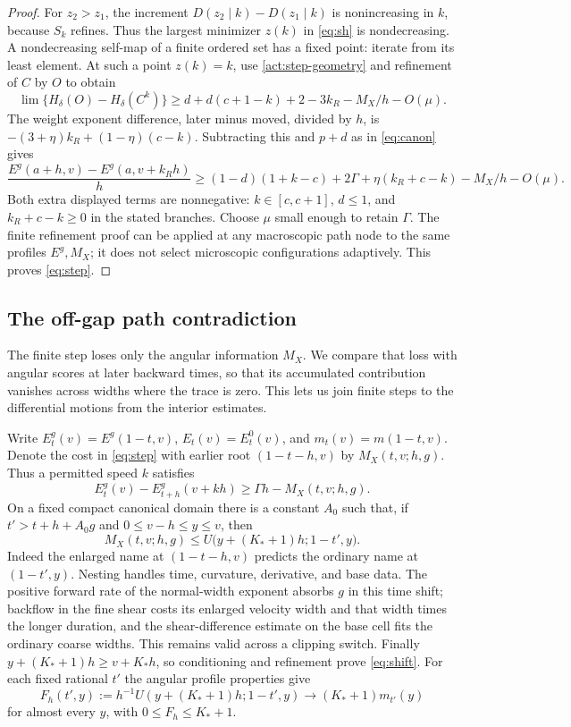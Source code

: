 \begin{proof}
For $z_2>z_1$, the increment
$D(z_2\mid k)-D(z_1\mid k)$ is nonincreasing in $k$, because
$S_k$ refines.  Thus the largest minimizer $z(k)$ in
\eqref{eq:sh} is nondecreasing.  A nondecreasing self-map of a
finite ordered set has a fixed point: iterate from its least
element.  At such a point $z(k)=k$, use
\eqref{act:step-geometry} and refinement of $C$ by $O$ to obtain
\[
 \lim\{H_\delta(O)-H_\delta(C^k)\}
 \ge d+d(c+1-k)+2-3k_R-M_X/h-O(\mu).
\]
The weight exponent difference, later minus moved, divided by $h$,
is $-(3+\eta)k_R+(1-\eta)(c-k)$.  Subtracting this and $p+d$
as in \eqref{eq:canon} gives
\[
 \frac{E^g(a+h,v)-E^g(a,v+k_Rh)}h
 \ge(1-d)(1+k-c)+2\Gamma
      +\eta(k_R+c-k)-M_X/h-O(\mu).
\]
Both extra displayed terms are nonnegative: $k\in[c,c+1]$,
$d\le1$, and $k_R+c-k\ge0$ in the stated branches.
Choose $\mu$ small enough to retain $\Gamma$.
The finite refinement proof can be applied at any macroscopic
path node to the same profiles $E^g,M_X$; it does not select
microscopic configurations adaptively.  This proves \eqref{eq:step}.
\end{proof}
\subsection{The off-gap path contradiction}

The finite step loses only the angular information $M_X$. We compare that
loss with angular scores at later backward times, so that its accumulated
contribution vanishes across widths where the trace is zero. This lets us
join finite steps to the differential motions from the interior estimates.

Write $E_t^g(v)=E^g(1-t,v)$, $E_t(v)=E_t^0(v)$, and
$m_t(v)=m(1-t,v)$.  Denote the cost in \eqref{eq:step} with
earlier root $(1-t-h,v)$ by $M_X(t,v;h,g)$.  Thus a permitted
speed $k$ satisfies
\[
 E_t^g(v)-E_{t+h}^g(v+kh)\ge\Gamma h-M_X(t,v;h,g).
\]
On a fixed compact canonical domain there is a constant $A_0$ such
that, if $t'>t+h+A_0g$ and $0\le v-h\le y\le v$, then
\begin{equation}
 M_X(t,v;h,g)
 \le U\bigl(y+(K_*+1)h;1-t',y\bigr).
 \tag{shift}\label{eq:shift}
\end{equation}
Indeed the enlarged name at $(1-t-h,v)$ predicts the ordinary
name at $(1-t',y)$.  Nesting handles time, curvature, derivative,
and base data.  The positive forward rate of the normal-width exponent
absorbs $g$ in this time shift; backflow in the fine shear costs
its enlarged velocity width and that width times the longer
duration, and the shear-difference estimate on the base cell
fits the ordinary coarse widths.  This remains valid across a
clipping switch.  Finally $y+(K_*+1)h\ge v+K_*h$, so conditioning
and refinement prove \eqref{eq:shift}.  For each fixed rational
$t'$ the angular profile properties give
\begin{equation}\label{act:shift-limit}
 F_h(t',y):=h^{-1}U(y+(K_*+1)h;1-t',y)
 \longrightarrow(K_*+1)m_{t'}(y)
\end{equation}
for almost every $y$, with $0\le F_h\le K_*+1$.

